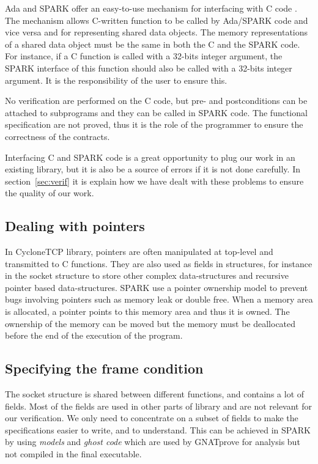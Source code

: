 \documentclass[conference]{IEEEtran}
\begin{document}
Ada and SPARK offer an easy-to-use mechanism for interfacing with C code \cite{}. The mechanism allows C-written function to be called by Ada/SPARK code and vice versa and for representing shared data objects. The memory representations of a shared data object must be the same in both the C and the SPARK code. For instance, if a C function is called with a 32-bits integer argument, the SPARK interface of this function should also be called with a 32-bits integer argument. It is the responsibility of the user to ensure this. 


No verification are
performed on the C code, but pre- and postconditions can be attached to
subprograms and they can be called in SPARK code.
The functional specification are not proved, thus it is the role of the
programmer to ensure the correctness of the contracts.


Interfacing C and SPARK code is a great opportunity to plug our work in an
existing library, but it is also be a source of errors if it is not done
carefully. In section~\ref{sec:verif} it is explain how we have dealt with these
problems to ensure the quality of our work.

\subsection{Dealing with pointers}
\label{sec:pointers}

In CycloneTCP library, pointers are often manipulated at top-level and transmitted
to C functions. They are also used as fields in structures, for instance in
the socket structure to store other complex data-structures and recursive pointer
based data-structures. SPARK use a pointer ownership model to prevent bugs
involving pointers such as memory leak or double free. When a memory area is
allocated, a pointer points to this memory area and thus it is owned.
The ownership of the memory can be moved but the memory must be deallocated
before the end of the execution of the program.

\subsection{Specifying the frame condition}

The socket structure is shared between different functions, and contains a lot
of fields. Most of the fields are used in other parts of library and are not
relevant for our verification. We only need to concentrate on a subset of fields
to make the specifications easier to write, and to understand.
This can be achieved in SPARK by using \emph{models} and \emph{ghost code}
which are used by GNATprove for analysis but not compiled in the final executable.
\end{document}

